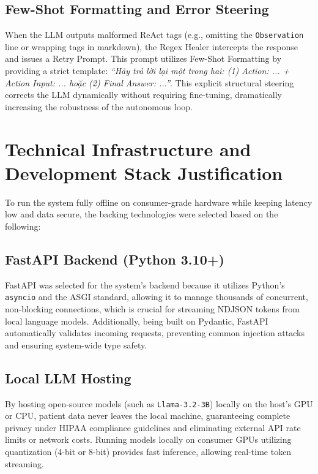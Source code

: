 \documentclass[../main.tex]{subfiles}
\begin{document}
\subsection{Few-Shot Formatting and Error Steering}
When the LLM outputs malformed ReAct tags (e.g., omitting the \texttt{Observation} line or wrapping tags in markdown), the Regex Healer intercepts the response and issues a Retry Prompt. This prompt utilizes Few-Shot Formatting by providing a strict template: \textit{``Hãy trả lời lại một trong hai: (1) Action: ... + Action Input: ... hoặc (2) Final Answer: ...''}. This explicit structural steering corrects the LLM dynamically without requiring fine-tuning, dramatically increasing the robustness of the autonomous loop.

\section{Technical Infrastructure and Development Stack Justification}
\label{section:3.5}

To run the system fully offline on consumer-grade hardware while keeping latency low and data secure, the backing technologies were selected based on the following:

\subsection{FastAPI Backend (Python 3.10+)}
FastAPI was selected for the system's backend because it utilizes Python's \texttt{asyncio} and the ASGI standard, allowing it to manage thousands of concurrent, non-blocking connections, which is crucial for streaming NDJSON tokens from local language models. Additionally, being built on Pydantic, FastAPI automatically validates incoming requests, preventing common injection attacks and ensuring system-wide type safety.

\subsection{Local LLM Hosting}
By hosting open-source models (such as \texttt{Llama-3.2-3B}) locally on the host's GPU or CPU, patient data never leaves the local machine, guaranteeing complete privacy under HIPAA compliance guidelines and eliminating external API rate limits or network costs. Running models locally on consumer GPUs utilizing quantization (4-bit or 8-bit) provides fast inference, allowing real-time token streaming.
\end{document}

